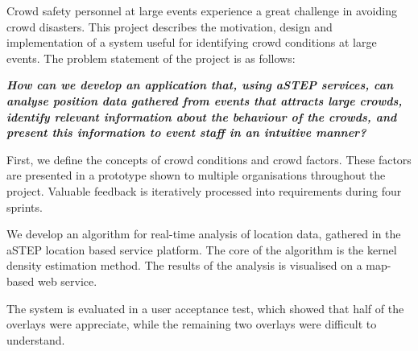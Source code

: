 Crowd safety personnel at large events experience a great challenge in avoiding crowd disasters. This project describes the motivation, design and implementation of a system useful for identifying crowd conditions at large events. The problem statement of the project is as follows:

\textbf{\textit{How can we develop an application that, using aSTEP services, can analyse position data gathered from events that attracts large crowds, identify relevant information about the behaviour of the crowds, and present this information to event staff in an intuitive manner?}}

First, we define the concepts of crowd conditions and crowd factors. These factors are presented in a prototype shown to multiple organisations throughout the project. Valuable feedback is iteratively processed into requirements during four sprints.

We develop an algorithm for real-time analysis of location data, gathered in the aSTEP location based service platform. The core of the algorithm is the kernel density estimation method. The results of the analysis is visualised on a map-based web service.

The system is evaluated in a user acceptance test, which showed that half of the overlays were appreciate, while the remaining two overlays were difficult to understand.



